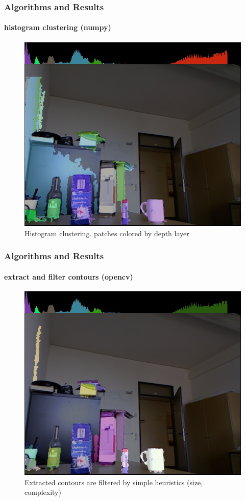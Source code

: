 \documentclass[]{beamer}
\begin{document}
\begin{frame}
    \frametitle{Algorithms and Results}
    \framesubtitle{histogram clustering (numpy)}
    \begin{figure}[h]
        \centering
            \includegraphics[height=0.6\textheight]{../images/cluster_bli_erode.jpg}
        \caption{Histogram clustering. patches colored by depth layer}
        \label{sg:fig:images_cluster_bli_erode}
    \end{figure}
\end{frame}


\begin{frame}
    \frametitle{Algorithms and Results}
    \framesubtitle{extract and filter contours (opencv)}
    \begin{figure}[h]
        \centering
    \includegraphics[height=0.6\textheight]{../images/extracted_contours.jpg}
        \caption{Extracted contours are filtered by simple heuristics (size, complexity)}
        \label{sg:fig:images_extracted_contours}
    \end{figure}
\end{frame}
\end{document}
